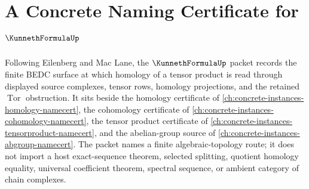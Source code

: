 \chapter{A Concrete Naming Certificate for $\KunnethFormulaUp$}
\label{ch:concrete-instances-kunneth-formula-namecert}

Following Eilenberg and Mac Lane, the $\KunnethFormulaUp$ packet records the finite BEDC surface at which homology of a tensor product is read through displayed source complexes, tensor rows, homology projections, and the retained $\operatorname{Tor}$ obstruction. It sits beside the homology certificate of \autoref{ch:concrete-instances-homology-namecert}, the cohomology certificate of \autoref{ch:concrete-instances-cohomology-namecert}, the tensor product certificate of \autoref{ch:concrete-instances-tensorproduct-namecert}, and the abelian-group source of \autoref{ch:concrete-instances-abgroup-namecert}. The packet names a finite algebraic-topology route; it does not import a host exact-sequence theorem, selected splitting, quotient homology equality, universal coefficient theorem, spectral sequence, or ambient category of chain complexes.

